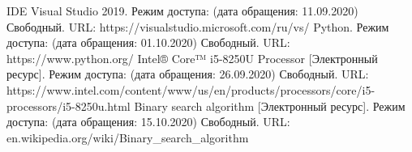 %




	
	\begin{center}
	\begin{thebibliography}{3}
	IDE Visual Studio 2019. Режим доступа: (дата обращения: 11.09.2020) Свободный. URL: https://visualstudio.microsoft.com/ru/vs/
	Python. Режим доступа: (дата обращения: 01.10.2020) Свободный. URL: https://www.python.org/
	Intel® Core™ i5-8250U Processor [Электронный ресурс]. Режим доступа: (дата обращения: 26.09.2020) Свободный. URL: https://www.intel.com/content/www/us/en/products/processors/core/i5-processors/i5-8250u.html
	Binary search algorithm [Электронный ресурс]. Режим доступа: (дата обращения: 15.10.2020) Свободный. URL: en.wikipedia.org/wiki/Binary\_search\_algorithm
	\end{thebibliography}
	\end{center}